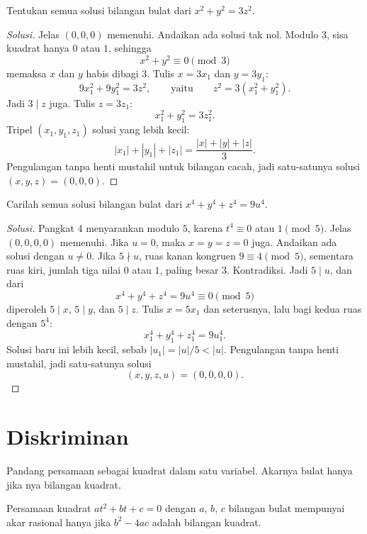 \documentclass[12pt]{scrartcl}
\begin{document}
\begin{example}
Tentukan semua solusi bilangan bulat dari $x^2 + y^2 = 3z^2$.
\end{example}
\begin{proof}[Solusi]
Jelas $(0, 0, 0)$ memenuhi. Andaikan ada solusi tak nol.
Modulo $3$, sisa kuadrat hanya $0$ atau $1$, sehingga
\[ x^2 + y^2 \equiv 0 \pmod{3} \]
memaksa $x$ dan $y$ habis dibagi $3$.
Tulis $x = 3x_1$ dan $y = 3y_1$:
\[ 9x_1^2 + 9y_1^2 = 3z^2, \qquad \text{yaitu} \qquad z^2 = 3(x_1^2 + y_1^2). \]
Jadi $3 \mid z$ juga. Tulis $z = 3z_1$:
\[ x_1^2 + y_1^2 = 3z_1^2. \]
Tripel $(x_1, y_1, z_1)$ solusi yang lebih kecil:
\[ |x_1| + |y_1| + |z_1| = \frac{|x| + |y| + |z|}{3}. \]
Pengulangan tanpa henti mustahil untuk bilangan cacah,
jadi satu-satunya solusi $(x, y, z) = (0, 0, 0)$.
\end{proof}

\begin{example}
Carilah semua solusi bilangan bulat dari $x^4 + y^4 + z^4 = 9u^4$.
\end{example}
\begin{proof}[Solusi]
Pangkat $4$ menyarankan modulo $5$, karena $t^4 \equiv 0$ atau $1 \pmod{5}$.
Jelas $(0, 0, 0, 0)$ memenuhi. Jika $u = 0$, maka $x = y = z = 0$ juga.
Andaikan ada solusi dengan $u \ne 0$.
Jika $5 \nmid u$, ruas kanan kongruen $9 \equiv 4 \pmod{5}$,
sementara ruas kiri, jumlah tiga nilai $0$ atau $1$, paling besar $3$.
Kontradiksi. Jadi $5 \mid u$, dan dari
\[ x^4 + y^4 + z^4 = 9u^4 \equiv 0 \pmod{5} \]
diperoleh $5 \mid x$, $5 \mid y$, dan $5 \mid z$.
Tulis $x = 5x_1$ dan seterusnya, lalu bagi kedua ruas dengan $5^4$:
\[ x_1^4 + y_1^4 + z_1^4 = 9u_1^4. \]
Solusi baru ini lebih kecil, sebab $|u_1| = |u|/5 < |u|$.
Pengulangan tanpa henti mustahil, jadi satu-satunya solusi
\[ (x, y, z, u) = (0, 0, 0, 0). \]
\end{proof}

\section{Diskriminan}

Pandang persamaan sebagai kuadrat dalam satu variabel.
Akarnya bulat hanya jika nya bilangan kuadrat.

\begin{fact}
Persamaan kuadrat $at^2 + bt + c = 0$ dengan $a$, $b$, $c$ bilangan bulat
mempunyai akar rasional hanya jika $b^2 - 4ac$ adalah bilangan kuadrat.
\end{fact}
\end{document}
